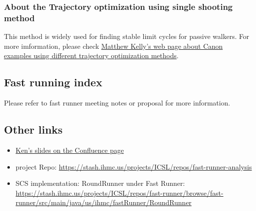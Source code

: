\subsubsection{About the Trajectory optimization using single shooting method}
This method is widely used for finding stable limit cycles for passive walkers. For more imformation, please check \href{http://www.matthewpeterkelly.com/tutorials/trajectoryOptimization/canon.html}{Matthew Kelly's web page about Canon examples using different trajectory optimization methods}.
\subsection{Fast running index}
Please refer to fast runner meeting notes or proposal for more information.
\subsection{Other links}
\begin{itemize}
	\item \href{https://confluence.ihmc.us/x/Q4BIC}{Ken's slides on the Confluence page}
	\item project Repo: \href{https://stash.ihmc.us/projects/ICSL/repos/fast-runner-analysis}{https://stash.ihmc.us/projects/ICSL/repos/fast-runner-analysis}
	\item SCS implementation: RoundRunner under Fast Runner: \href{https://stash.ihmc.us/projects/ICSL/repos/fast-runner/browse/fast-runner/src/main/java/us/ihmc/fastRunner/RoundRunner}{https://stash.ihmc.us/projects/ICSL/repos/fast-runner/browse/fast-runner/src/main/java/us/ihmc/fastRunner/RoundRunner}
\end{itemize}


